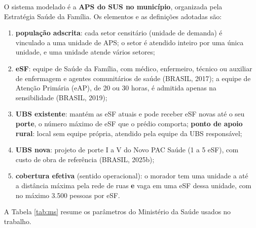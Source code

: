 \documentclass[11pt,a4paper]{article}
\begin{document}
O sistema modelado é a \textbf{APS do SUS no município}, organizada pela Estratégia Saúde da Família. Os elementos e as definições adotadas são:
\begin{enumerate}[label=\alph*),leftmargin=*,itemsep=2pt]
\item \textbf{população adscrita}: cada setor censitário (unidade de demanda) é vinculado a uma unidade de APS; o setor é atendido inteiro por uma única unidade, e uma unidade atende vários setores;
\item \textbf{eSF}: equipe de Saúde da Família, com médico, enfermeiro, técnico ou auxiliar de enfermagem e agentes comunitários de saúde (BRASIL, 2017); a equipe de Atenção Primária (eAP), de 20 ou 30 horas, é admitida apenas na sensibilidade (BRASIL, 2019);
\item \textbf{UBS existente}: mantém as eSF atuais e pode receber eSF novas até o seu \textbf{porte}, o número máximo de eSF que o prédio comporta; \textbf{ponto de apoio rural}: local sem equipe própria, atendido pela equipe da UBS responsável;
\item \textbf{UBS nova}: projeto de porte I a V do Novo PAC Saúde (1 a 5 eSF), com custo de obra de referência (BRASIL, 2025b);
\item \textbf{cobertura efetiva} (sentido operacional): o morador tem uma unidade a até a distância máxima pela rede de ruas \textbf{e} vaga em uma eSF dessa unidade, com no máximo 3.500 pessoas por eSF.
\end{enumerate}

A Tabela \ref{tab:ms} resume os parâmetros do Ministério da Saúde usados no trabalho.
\end{document}

